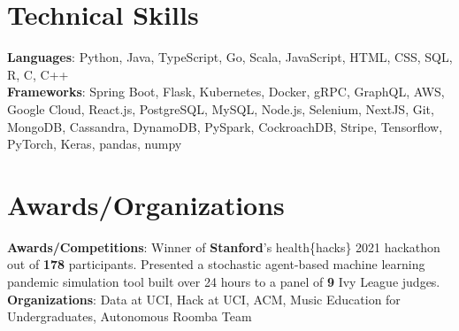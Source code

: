 \documentclass[letterpaper,11pt]{article}
\begin{document}
\section{Technical Skills}
 \begin{itemize}[leftmargin=0.15in, label={}]
    \small{\item{
     \textbf{Languages}{: Python, Java, TypeScript, Go, Scala, JavaScript, HTML, CSS, SQL, R, C, C++} \\
     \textbf{Frameworks}{: Spring Boot, Flask, Kubernetes, Docker, gRPC, GraphQL, AWS, Google Cloud, React.js, PostgreSQL, MySQL, Node.js, Selenium, NextJS, Git, MongoDB, Cassandra, DynamoDB, PySpark, CockroachDB, Stripe, Tensorflow, PyTorch, Keras, pandas, numpy} \\
    }}

 \end{itemize}

\section{Awards/Organizations}
 \begin{itemize}[leftmargin=0.15in, label={}]
    \small{\item{
     \textbf{Awards/Competitions}{: Winner of \textbf{Stanford}'s health\{hacks\} 2021 hackathon out of \textbf{178} participants. Presented a stochastic agent-based machine learning pandemic simulation tool built over 24 hours to a panel of \textbf{9} Ivy League judges.} \\
     \textbf{Organizations}{: Data at UCI, Hack at UCI, ACM, Music Education for Undergraduates, Autonomous Roomba Team}
    }}
 \end{itemize}


\end{document}
